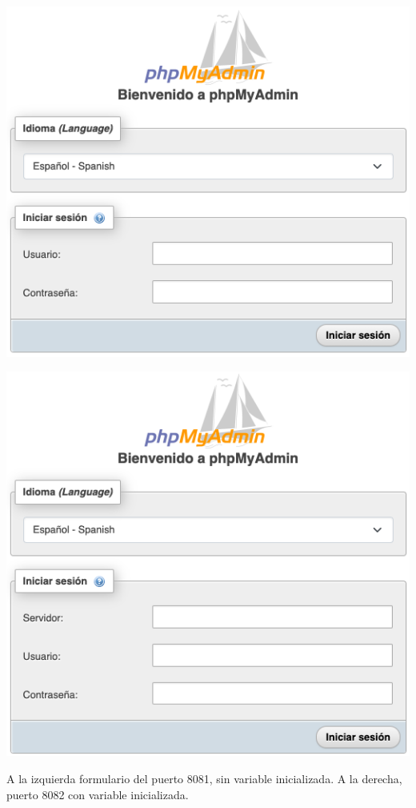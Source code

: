 {
    \begin{minipage}{0.43\linewidth}
        \vspace{-11pt}
        \includegraphics[width=\linewidth]{img/docker/phpmyadmin1.png}
    \end{minipage}
    \hfill
    \begin{minipage}{0.43\linewidth}
        \vspace{-11pt}
        \includegraphics[width=\linewidth]{img/docker/phpmyadmin2.png}
    \end{minipage}

    \begin{center}
        \vspace{-18pt}
        {\footnotesize A la izquierda formulario del puerto 8081, sin variable inicializada. A la derecha, puerto 8082 con variable inicializada.}
    \end{center}
}

